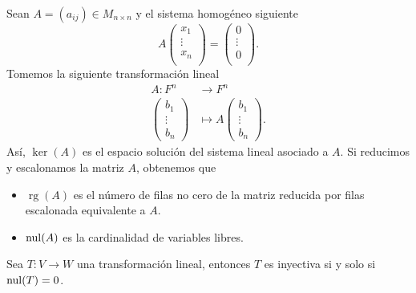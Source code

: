 \documentclass[12pt,a4paper]{book}
\newcommand{\rg}{\operatorname{rg}}
\begin{document}
    \begin{ejemplo}
    \label{ej:27}
        Sean $A = (a_{ij}) \in M_{n \times n}$ y el sistema homogéneo siguiente
        \begin{equation*}
        A
        \begin{pmatrix}
        x_{1} \\
        \vdots \\
        x_{n} \\
        \end{pmatrix}
        = 
        \begin{pmatrix}
        0\\
        \vdots\\
        0\\
        \end{pmatrix}.
        \end{equation*}
        Tomemos la siguiente transformación lineal
        \begin{align*}
            A:F^{n} & \to F^{n}\\
            \begin{pmatrix}
                b_{1}\\
                \vdots\\
                b_{n}
            \end{pmatrix}
            & \mapsto A
            \begin{pmatrix}
                b_{1}\\
                \vdots\\
                b_{n}
            \end{pmatrix}.
        \end{align*}
        Así, $\ker(A)$ es el espacio solución del sistema lineal asociado a $A$. Si reducimos y escalonamos la matriz $A$, obtenemos que
        \begin{itemize}
            \item $\rg(A)$ es el número de filas no cero de la matriz reducida por filas escalonada equivalente a $A$.
            \item $\operatorname{nul}(A)$ es la cardinalidad de variables libres.
        \end{itemize}
    \end{ejemplo}

    \begin{proposicion}
    \label{prop:27}
        Sea $T:V \to W$ una transformación lineal, entonces $T$ es inyectiva si y solo si $\operatorname{nul}(T) = 0$.
    \end{proposicion}
\end{document}
